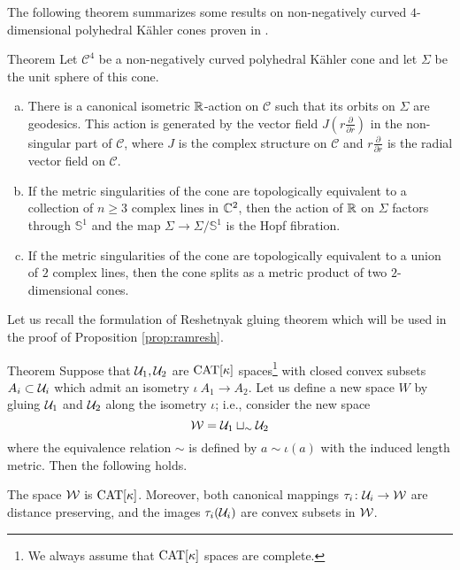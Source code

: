 \documentclass[oneside,a4paper]{article}
\def\SS{\mathbb{S}}
\begin{document}
The following theorem summarizes some results on non-negatively
curved $4$-dimensional polyhedral K\"ahler cones proven in \cite[Theorems 1.5, 1.7, 1.8]{panov}.
\begin{thm}{Theorem}\label{allPK}
Let $\mathcal C^4$ be a non-negatively curved polyhedral K\"ahler cone and let $\Sigma$
be the unit sphere of this cone.

\begin{enumerate}[(a)]
\item There is a canonical isometric $\mathbb{R}$-action on $\mathcal C$
such that its orbits on $\Sigma$ are geodesics. This action is generated
by the vector field $J(r\frac{\partial}{\partial r})$ in the non-singular part
of $\mathcal C$, where $J$ is the complex structure on $\mathcal C$ and $r\frac{\partial}{\partial r}$
is the radial vector field on $\mathcal C$.
\item If the metric singularities of the cone are topologically equivalent to
a collection of $n\ge 3$ complex lines in $\mathbb{C}^2$, then the action
of $\mathbb{R}$ on $\Sigma$ factors through $\SS^1$ and the map
$\Sigma\to \Sigma/\SS^1$ is the Hopf fibration.
\item\label{allPK:3} If the metric singularities of the cone are topologically equivalent to
a union of $2$ complex lines, then the cone splits as a metric product
of two $2$-dimensional cones.
\end{enumerate}
\end{thm}

Let us recall the formulation of Reshetnyak gluing theorem which will be used in the proof of  Proposition \ref{prop:ramresh}.

\begin{thm}{Theorem}\label{thm:gluing}
Suppose that
$\mathcal{U}_1, \mathcal{U}_2$ are $\mathrm{CAT}[\kappa]$ spaces\footnote{We always assume that $\mathrm{CAT}[\kappa]$ spaces are complete.} with
closed convex subsets $A_i\subset\mathcal{U}_i$
which admit an isometry $\iota\:A_1\to A_2$.
Let us define a new space $W$ by gluing 
$\mathcal{U}_1$ and  $\mathcal{U}_2$ along the isometry $\iota$;
i.e.,  consider the new space
\[\mathcal{W}=\mathcal{U}_1\sqcup_\sim\mathcal{U}_2\]
where the equivalence relation $\sim$ is defined by $a\sim \iota(a)$ with the induced length metric. Then the following holds.

The space $\mathcal{W}$ is $\mathrm{CAT}[\kappa]$.
Moreover, both canonical mappings
$\tau_i\colon\mathcal{U}_i\to\mathcal{W}$ are distance preserving,
and the images $\tau_i(\mathcal{U}_i)$ are convex subsets in $\mathcal{W}$.
\end{thm}
\end{document}
